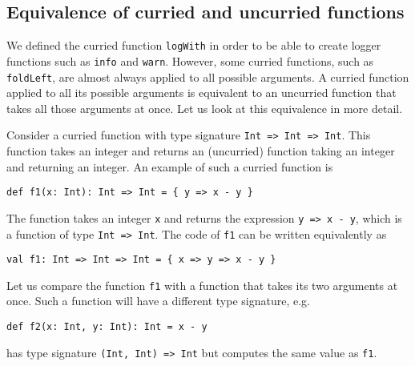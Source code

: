 \subsection{Equivalence of curried and uncurried functions}

We defined the curried function \lstinline!logWith!
in order to be able to create logger functions such as \lstinline!info!
and \lstinline!warn!. However,
some curried functions, such as \lstinline!foldLeft!,
are almost always applied to all possible arguments. A curried function
applied to all its possible arguments is equivalent to an uncurried
function that takes all those arguments at once. Let us look at this
equivalence in more detail.

Consider a curried function with type signature \lstinline!Int => Int => Int!.
This function takes an integer and returns an (uncurried) function
taking an integer and returning an integer. An example of such a curried
function is
\begin{lstlisting}
def f1(x: Int): Int => Int = { y => x - y }
\end{lstlisting}
The function takes an integer \lstinline!x!
and returns the expression \lstinline!y => x - y!,
which is a function of type \lstinline!Int => Int!.
The code of \lstinline!f1!
can be written equivalently as
\begin{lstlisting}
val f1: Int => Int => Int = { x => y => x - y }
\end{lstlisting}
Let us compare the function \lstinline!f1!
with a function that takes its two arguments at once. Such a function
will have a different type signature, e.g.
\begin{lstlisting}
def f2(x: Int, y: Int): Int = x - y
\end{lstlisting}
has type signature \lstinline!(Int, Int) => Int!
but computes the same value as \lstinline!f1!.

